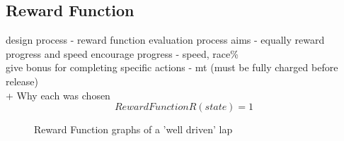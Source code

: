 \subsection{Reward Function}
design process - reward function evaluation process
aims - equally reward progress and speed
encourage progress - speed, race\%
\\give bonus for completing specific actions - mt (must be fully charged before release)
\\ + Why each was chosen
\[
Reward Function
R(state) = 1
\]
\begin{figure}[ht]
    \centering
    \hfill
    \caption{Reward Function graphs of a 'well driven' lap}
\end{figure}
